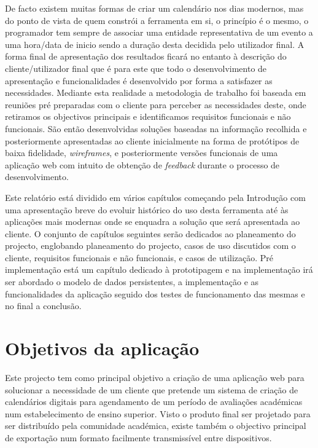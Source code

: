\documentclass[11pt, twoside]{report}
\begin{document}
	De facto existem muitas formas de criar um calendário nos dias modernos, mas do ponto de vista de quem constrói a ferramenta em si, o princípio é o mesmo, o programador tem sempre de associar uma entidade representativa de um evento a uma hora/data de inicio sendo a duração desta decidida pelo utilizador final. 
	A forma final de apresentação dos resultados ficará no entanto à descrição do cliente/utilizador final que é para este que todo o desenvolvimento de apresentação e funcionalidades é desenvolvido por forma a satisfazer as necessidades.
	Mediante esta realidade a metodologia de trabalho foi baseada em reuniões pré preparadas com o cliente para perceber as necessidades deste, onde retiramos os objectivos principais e identificamos requisitos funcionais e não funcionais.
	São então desenvolvidas soluções baseadas na informação recolhida e posteriormente apresentadas ao cliente inicialmente na forma de protótipos de baixa fidelidade, \textit{wireframes}, e posteriormente versões funcionais de uma aplicação web com intuito de obtenção de \textit{feedback} durante o processo de desenvolvimento.
	
	Este relatório está dividido em vários capítulos começando pela Introdução com uma apresentação breve do evoluir histórico do uso desta ferramenta até às aplicações mais modernas onde se enquadra a solução que será apresentada ao cliente.
	O conjunto de capítulos seguintes serão dedicados ao planeamento do projecto, englobando planeamento do projecto, casos de uso discutidos com o cliente, requisitos funcionais e não funcionais, e casos de utilização.
	Pré implementação está um capítulo dedicado à prototipagem e na implementação irá ser abordado  o modelo de dados persistentes, a implementação e as funcionalidades da aplicação seguido dos testes de funcionamento das mesmas e no final a conclusão.
	
	\section{Objetivos da aplicação}
	
	Este projecto tem como principal objetivo a criação de uma aplicação web para solucionar a necessidade de um cliente que pretende um sistema de criação de calendários digitais para agendamento de um período de avaliações académicas num estabelecimento de ensino superior. 
	Visto o produto final ser projetado para ser distribuído pela comunidade académica, existe também o objectivo principal de exportação num formato facilmente transmissível entre dispositivos.  
	
\end{document}
